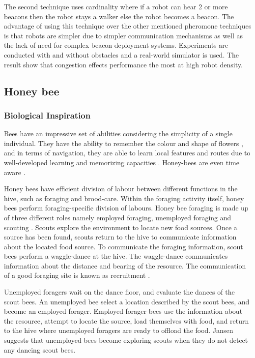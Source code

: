 The second technique uses cardinality where if a robot can hear 2 or more beacons then the robot stays a walker else the robot becomes a beacon. The advantage of using this technique over the other mentioned pheromone techniques is that robots are simpler due to simpler communication mechanisms as well as the lack of need for complex beacon deployment systems. Experiments are conducted with and without obstacles and a real-world simulator is used. The result show that congestion effects performance the most at high robot density. 
\subsection{Honey bee}
\label{honeybee}

\subsubsection{Biological Inspiration}
\label{ants:biologicalinspiration}
Bees have an impressive set of abilities considering the simplicity of a single individual. They have the ability to remember the colour and shape of flowers \cite{zhang2006honeybee}, and in terms of navigation, they are able to learn local features and routes due to well-developed learning and memorizing capacities \cite{menzel2001cognitive}. Honey-bees are even time aware \cite{moore1989influence}. 

Honey bees have efficient division of labour between different functions in the hive, such as foraging and brood-care. Within the foraging activity itself, honey bees perform foraging-specific division of labours. Honey bee foraging is made up of three different roles namely employed foraging, unemployed foraging and scouting \cite{seeley2009wisdom}. Scouts explore the environment to locate new food sources. Once a source has been found, scouts return to the hive to communicate information about the located food source. To communicate the foraging information, scout bees perform a waggle-dance at the hive. The waggle-dance communicates information about the distance and bearing of the resource. The communication of a good foraging site is known as recruitment \cite{seeley2009wisdom}.

Unemployed foragers wait on the dance floor, and evaluate the dances of the scout bees. An unemployed bee select a location described by the scout bees, and become an employed forager. Employed forager bees use the information about the resource, attempt to locate the source, load themselves with food, and return to the hive where unemployed foragers are ready to offload the food. Jansen \cite{janson2007searching} suggests that unemployed bees become exploring scouts when they do not detect any dancing scout bees. 

